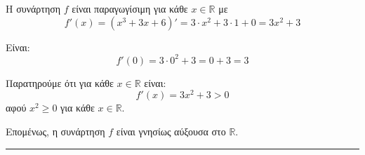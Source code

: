 \begin{alist}
    \item Η συνάρτηση $f$ είναι παραγωγίσιμη για κάθε $x \in \mathbb{R}$ με
    \[
        f'(x) = (x^3 + 3x + 6)' = 3 \cdot x^2 + 3 \cdot 1 + 0 = 3x^2 + 3
    \]

    \item Είναι:
    \[
        f'(0) = 3 \cdot 0^2 + 3 = 0 + 3 = 3
    \]

    \item Παρατηρούμε ότι για κάθε $x \in \mathbb{R}$ είναι:
    \[
        f'(x) = 3x^2 + 3 > 0
    \]
    αφού $x^2 \ge 0$ για κάθε $x \in \mathbb{R}$.

    Επομένως, η συνάρτηση $f$ είναι γνησίως αύξουσα στο $\mathbb{R}$.
\end{alist}
\vspace{6mm}
\noindent\rule{\textwidth}{0.4pt}
\vspace{6mm}

